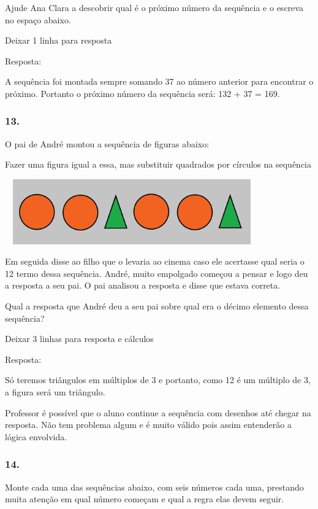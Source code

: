 Ajude Ana Clara a descobrir qual é o próximo número da sequência e o
escreva no espaço abaixo.

Deixar 1 linha para resposta

Resposta:

A sequência foi montada sempre somando 37 ao número anterior para
encontrar o próximo. Portanto o próximo número da sequência será: 132 +
37 = 169.

\subsubsection{13.}\label{section-45}

O pai de André montou a sequência de figuras abaixo:

Fazer uma figura igual a essa, mas substituir quadrados por círculos na
sequência

\includegraphics[width=4.30871in,height=1.10010in]{media/image36.png}

Em seguida disse ao filho que o levaria ao cinema caso ele acertasse
qual seria o 12 termo dessa sequência. André, muito empolgado começou a
pensar e logo deu a resposta a seu pai. O pai analisou a resposta e
disse que estava correta.

Qual a resposta que André deu a seu pai sobre qual era o décimo elemento
dessa sequência?

Deixar 3 linhas para resposta e cálculos

Resposta:

Só teremos triângulos em múltiplos de 3 e portanto, como 12 é um
múltiplo de 3, a figura será um triângulo.

Professor é possível que o aluno continue a sequência com desenhos até
chegar na resposta. Não tem problema algum e é muito válido pois assim
entenderão a lógica envolvida.

\subsubsection{14.}\label{section-46}

Monte cada uma das sequências abaixo, com seis números cada uma,
prestando muita atenção em qual número começam e qual a regra elas devem
seguir.


